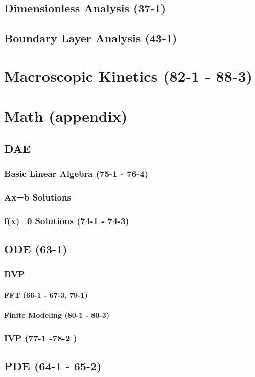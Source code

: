 \documentclass{mitqualif}
\begin{document}
\section{Dimensionless Analysis (37-1)}
\section{Boundary Layer Analysis (43-1)}
\newpage
\chapter{Macroscopic Kinetics (82-1 - 88-3)}
\newpage
\chapter{Math (appendix)}
\section{DAE}
\subsection{Basic Linear Algebra (75-1 - 76-4)}
\subsection{Ax=b Solutions}
\subsection{f(x)=0 Solutions (74-1 - 74-3)}
\section{ODE (63-1)}
\subsection{BVP}
\subsubsection{FFT (66-1 - 67-3, 79-1)}
\subsubsection{Finite Modeling (80-1 - 80-3)}
\subsection{IVP (77-1 -78-2 )}
\section{PDE (64-1 - 65-2)}
\end{document}
